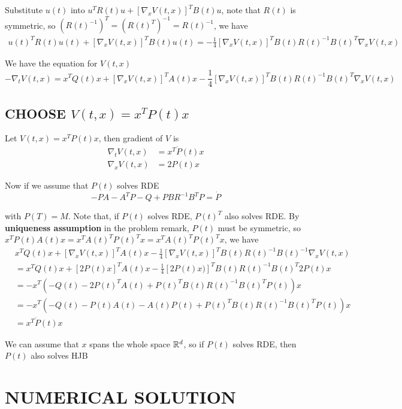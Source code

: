 Substitute $u(t)$ into $u^T R(t) u + [\nabla_x V(t, x)]^T B(t) u$, note that $R(t)$ is symmetric, so $(R(t)^{-1})^T = (R(t)^T)^{-1} = R(t)^{-1}$, we have
\begin{align*}
	u(t)^T R(t) u(t) + [\nabla_x V(t, x)]^T B(t) u(t) = - \frac{1}{4} [\nabla_x V(t,x)]^T B(t) R(t)^{-1} B(t)^T \nabla_x V(t, x)
\end{align*}

We have the equation for $V(t, x)$
$$
	- \nabla_t V(t, x) = x^T Q(t)x + [\nabla_x V(t, x)]^T A(t) x - \frac{1}{4} [\nabla_x V(t,x)]^T B(t) R(t)^{-1} B(t)^T \nabla_x V(t, x)
$$

\subsection{CHOOSE $V(t, x) = x^T P(t) x$}

Let $V(t, x) = x^T P(t) x$, then gradient of $V$ is 
\begin{align*}
	\nabla_t V(t, x) &= x^T \dot{P}(t) x \\
	\nabla_x V(t, x) &= 2 P(t) x
\end{align*}

Now if we assume that $P(t)$ solves RDE
$$
	- P A - A^T P - Q +  P B R^{-1} B^T P = \dot{P}
$$

with $P(T) = M$. Note that, if $P(t)$ solves RDE, $P(t)^T$ also solves RDE. By \textbf{uniqueness assumption} in the problem remark, $P(t)$ must be symmetric, so $x^T P(t) A(t) x = x^T A(t)^T P(t)^T x = x^T A(t)^T P(t)^T x$, we have
\begin{align*}
	&x^T Q(t)x + [\nabla_x V(t, x)]^T A(t) x - \frac{1}{4} [\nabla_x V(t,x)]^T B(t) R(t)^{-1} B(t)^{-1} \nabla_x V(t, x) \\
	&= x^T Q(t)x + [2 P(t) x]^T A(t) x - \frac{1}{4} [2 P(t) x)]^T B(t) R(t)^{-1} B(t)^T 2 P(t) x \\
	&= - x^T (- Q(t) - 2 P(t)^T A(t) + P(t)^T B(t) R(t)^{-1} B(t)^T P(t))x \\
	&= - x^T (- Q(t) - P(t) A(t) - A(t) P(t) + P(t)^T B(t) R(t)^{-1} B(t)^T P(t))x \\
	&= x^T \dot{P}(t) x
\end{align*}

We can assume that $x$ spans the whole space $\mathbb{R}^d$, so if $P(t)$ solves RDE, then $P(t)$ also solves HJB

\section{NUMERICAL SOLUTION}

